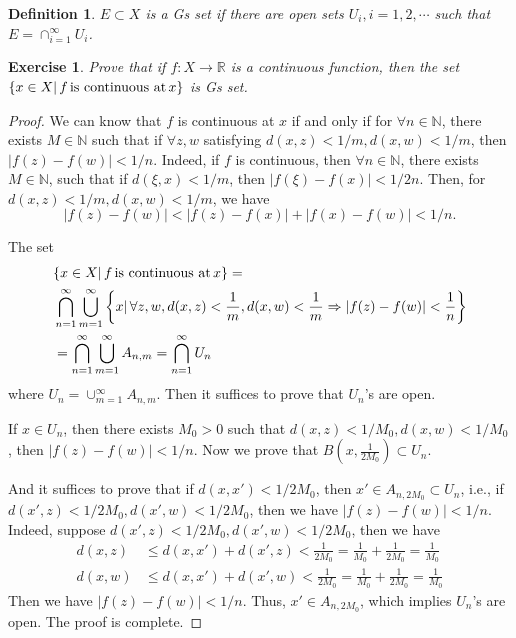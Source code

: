 \documentclass[12pt,leqno]{amsart}
\newtheorem{definition}{Definition}[section]
\newtheorem{exercise}{Exercise}[section]
\theoremstyle{definition}
\numberwithin{equation}{subsection}
\begin{document}
\begin{definition}
$E\subset X$ is a Gs set if there are open sets $U_i, i = 1,2,\cdots$ such that $E = \cap^\infty_{i=1}U_i$.
\end{definition}
\begin{exercise}
Prove that if $f:X\to\mathbb{R}$ is a continuous function, then the set $\{x\in X |\, f\, {\rm is \,\, continuous\,\, at}\, x\}$ is Gs set.
\end{exercise}
\begin{proof}
We can know  that $f$ is continuous at $x$ if and only if for $\forall n \in\mathbb{N}$, there exists $M\in\mathbb{N}$ such that if $\forall z,w$ satisfying $d(x,z) < 1/m, d(x,w) < 1/m$, then $|f(z) - f(w)| < 1/n$. Indeed, if $f$ is continuous, then $\forall n \in\mathbb{N}$, there exists $M\in\mathbb{N}$, such that if $d(\xi,x) < 1/m$, then $|f(\xi) - f(x)| < 1/2n$. Then, for $d(x,z) < 1/m, d(x,w) < 1/m$, we have $$|f(z) - f(w)| < |f(z) - f(x)| + |f(x) - f(w)| < 1/n.$$

The set 
\begin{align*}
    & \{x\in X |\, f\, {\rm is \,\, continuous\,\, at}\, x\} = \\
    & \bigcap^\infty_{n=1} \bigcup^\infty_{m=1} \left\{x |\, \forall z,w, d(x,z) < \frac{1}{m}, d(x,w) < \frac{1}{m} \Rightarrow |f(z) - f(w)| < \frac{1}{n} \right\} \\
    & = \bigcap^\infty_{n=1} \bigcup^\infty_{m=1} A_{n,m} = \bigcap^\infty_{n=1} U_n
\end{align*}
where $U_n = \cup^\infty_{m=1} A_{n,m}$. Then it suffices to prove that $U_n$'s are open. 

If $x\in U_n$, then there exists $M_0 > 0$ such that $d(x,z) < 1/M_0, d(x,w) < 1/M_0$, then $|f(z) - f(w)| < 1/n$. Now we prove that $B\left(x,\frac{1}{2M_0}\right)\subset U_n$. 

And it suffices to prove that if $d(x,x') < 1/2M_0$, then $x'\in A_{n,2M_0}\subset U_n$, i.e., if $d(x', z) < 1/2M_0, d(x', w) < 1/2M_0$, then we have $|f(z) - f(w)| < 1/n$. Indeed, suppose $d(x', z) < 1/2M_0, d(x', w) < 1/2M_0$, then we have 
\begin{align*}
    d(x,z) & \leq d(x,x') + d(x', z) < \frac{1}{2M_0} = \frac{1}{M_0} + \frac{1}{2M_0} = \frac{1}{M_0} \\
    d(x,w) & \leq d(x,x') + d(x', w) < \frac{1}{2M_0} = \frac{1}{M_0} + \frac{1}{2M_0} = \frac{1}{M_0}
\end{align*}
Then we have $|f(z) - f(w)| < 1/n$. Thus, $x'\in A_{n,2M_0}$, which implies $U_n$'s are open. The proof is complete.
\end{proof}
\end{document}
